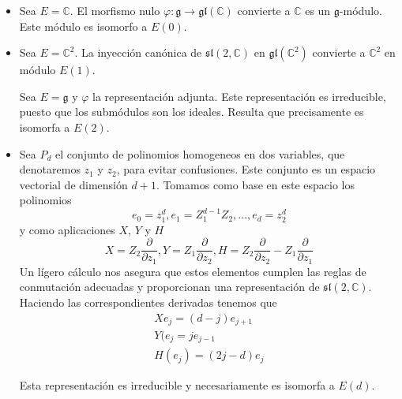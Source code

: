 \documentclass[a4paper,draft,12pt]{article}
\newcommand{\C}{\mathbb{C}}%
\newcommand{\g}{\mathfrak{g}}%
\begin{document}
\begin{itemize}


\item Sea $E= \C$.  El morfismo nulo $\varphi: \g \rightarrow \mathfrak{gl}(\C)$ convierte a $\C$ es un $\g$-módulo.  Este módulo es isomorfo a $E(0)$.

\item Sea $E= \C^2$.  La inyección canónica de $\mathfrak{sl}(2,\C)$ en $\mathfrak{gl}(\C^2)$ convierte a $\C^2$ en módulo $E(1)$.

Sea $E= \g$ y $\varphi$ la representación  adjunta.  Este representación es irreducible, puesto que los submódulos son los ideales.  Resulta que precisamente es isomorfa a $E(2)$.

\item Sea $P_d$ el conjunto de polinomios homogeneos en dos variables, que denotaremos $z_1$ y $z_2$, para evitar confusiones.  Este conjunto es un espacio vectorial de dimensión $d+1$.  Tomamos como base en este espacio los polinomios
$$
e_0=z_1^d, e_1= Z_1^{d-1}Z_2, \dots , e_d= z_2^d
$$
y como aplicaciones $X$, $Y$ y $H$
$$
X= Z_2 \frac{\partial}{\partial z_1}, Y= Z_1 \frac{\partial}{\partial z_2}, H= Z_2 \frac{\partial}{\partial z_2}- Z_1 \frac{\partial}{\partial z_1}
$$
Un lígero cálculo nos asegura que estos elementos cumplen las reglas de conmutación adecuadas y proporcionan una representación de $\mathfrak{sl}(2, \C)$.  Haciendo las correspondientes derivadas tenemos que
\begin{equation*}
\begin{split}
Xe_j= (d-j)e_{j+1} \\
Y(e_j= j e_{j-1} \\
H(e_j)= (2j-d)e_j
\end{split}
\end{equation*}

Esta representación es irreducible y necesariamente es isomorfa a $E(d)$.





\end{itemize}

\nocite{*}

\newpage






\printindex
\end{document}
